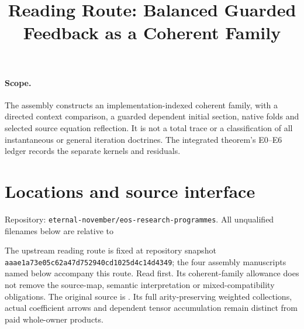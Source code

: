 \documentclass{article}
\title{Reading Route: Balanced Guarded Feedback as a Coherent Family}
\begin{document}
\maketitle
\paragraph{Scope.} The assembly constructs an implementation-indexed coherent family, with a directed context comparison, a guarded dependent initial section, native folds and selected source equation reflection. It is not a total trace or a classification of all instantaneous or general iteration doctrines. The integrated theorem's E0--E6 ledger records the separate kernels and residuals.
\section{Locations and source interface}
Repository: \texttt{eternal-november/eos-research-programmes}. All unqualified filenames below are relative to
\begin{quote}\small{}\end{quote}
The upstream reading route is fixed at repository snapshot \texttt{aaae1a73e05c62a47d752940cd1025d4c14d4349}; the four assembly manuscripts named below accompany this route.
Read  first. Its coherent-family allowance does not remove the source-map, semantic interpretation or mixed-compatibility obligations. The original source is . Its full arity-preserving weighted collections, actual coefficient arrows and dependent tensor accumulation remain distinct from paid whole-owner products.
\end{document}
